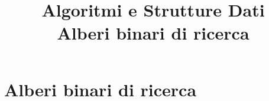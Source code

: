 

\usepackage[normalem]{ulem}
\usepackage{xcolor}
\usepackage{tikz}
\usetikzlibrary{trees}
\usetikzlibrary{shapes}
\usetikzlibrary{positioning}



\newcommand*\circled[1]{\tikz[baseline=(char.base)]{
            \node[minimum width=0.6cm,shape=circle,draw,inner sep=2pt,font=\ttfamily\bfseries] (char) {\small #1};}}
\newcommand*\circledr[1]{\tikz[baseline=(char.base)]{
            \node[minimum width=0.6cm,shape=circle,draw,fill=red!30,inner sep=2pt,font=\ttfamily\bfseries] (char) {\small #1};}}
\newcommand*\circledb[1]{\tikz[baseline=(char.base)]{
            \node[minimum width=0.6cm,shape=circle,draw,fill=blue!30,inner sep=2pt,font=\ttfamily\bfseries] (char) {\small #1};}}
            
\usepackage{xmpmulti}
\usepackage{listings}








\title[ASD - Strutture dati]{\textbf{Algoritmi e Strutture Dati}\\[24pt]
Alberi binari di ricerca}

\graphicspath{{figs/06/}}








\FrameTitle{}

\FrameContent

\section{Alberi binari di ricerca}

